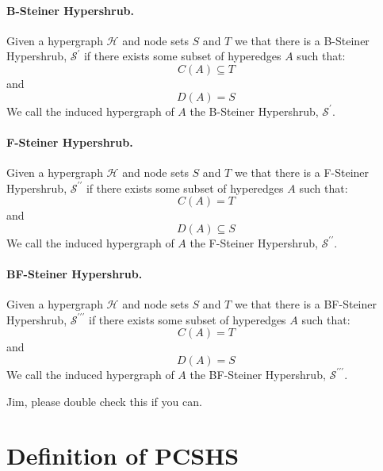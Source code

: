 \documentclass[12pt,twoside]{reedthesis}
\theoremstyle{definition}
\begin{document}
{\paragraph{B-Steiner Hypershrub.}Given a hypergraph $\mathcal{H}$ and node sets $S$ and $T$ we that there is a B-Steiner Hypershrub, $\mathcal{S}^{\prime}$ if there exists some subset of hyperedges $A$ such that:
\begin{equation*}
  C(A) \subseteq T
\end{equation*}
and
\begin{equation*}
  D(A) = S
\end{equation*}
We call the induced hypergraph of $A$ the B-Steiner Hypershrub, $\mathcal{S}^{\prime}$.\par
\paragraph{F-Steiner Hypershrub.}Given a hypergraph $\mathcal{H}$ and node sets $S$ and $T$ we that there is a F-Steiner Hypershrub, $\mathcal{S}^{\prime\prime}$ if there exists some subset of hyperedges $A$ such that:
\begin{equation*}
  C(A) = T
\end{equation*}
and
\begin{equation*}
  D(A) \subseteq S
\end{equation*}
We call the induced hypergraph of $A$ the F-Steiner Hypershrub, $\mathcal{S}^{\prime\prime}$.\par
\paragraph{BF-Steiner Hypershrub.}Given a hypergraph $\mathcal{H}$ and node sets $S$ and $T$ we that there is a BF-Steiner Hypershrub, $\mathcal{S}^{\prime\prime\prime}$ if there exists some subset of hyperedges $A$ such that:
\begin{equation*}
  C(A) = T
\end{equation*}
and
\begin{equation*}
  D(A) = S
\end{equation*}
We call the induced hypergraph of $A$ the BF-Steiner Hypershrub, $\mathcal{S}^{\prime\prime\prime}$.\par

}{Jim, please double check this if you can.}

\section{Definition of PCSHS}
\end{document}
